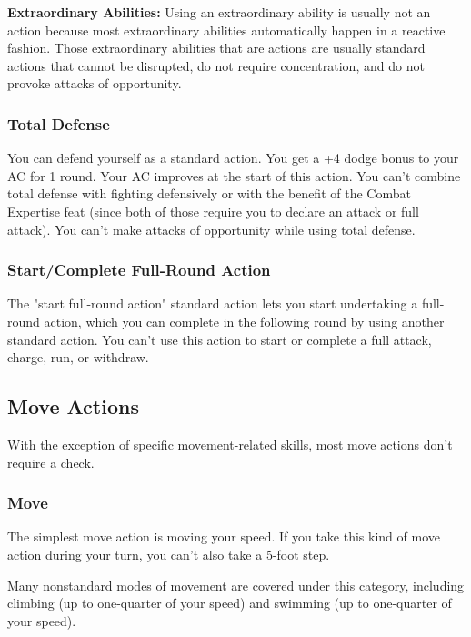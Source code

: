\textbf{Extraordinary Abilities:} Using an extraordinary ability is usually not 
an action because most extraordinary abilities automatically happen in a reactive 
fashion. Those extraordinary abilities that are actions are usually standard actions 
that cannot be disrupted, do not require concentration, and do not provoke attacks 
of opportunity.

\subsubsection{Total Defense}

You can defend yourself as a standard action. You get a +4 dodge bonus to your 
AC for 1 round. Your AC improves at the start of this action. You can't combine 
total defense with fighting defensively or with the benefit of the Combat Expertise 
feat (since both of those require you to declare an attack or full attack). You 
can't make attacks of opportunity while using total defense.

\subsubsection{Start/Complete Full-Round Action}

The "start full-round action" standard action lets you start undertaking a full-round 
action, which you can complete in the following round by using another standard 
action. You can't use this action to start or complete a full attack, charge, run, 
or withdraw.

\subsection{Move Actions}

With the exception of specific movement-related skills, most move actions don't 
require a check.

\subsubsection{Move}

The simplest move action is moving your speed. If you take this kind of move action 
during your turn, you can't also take a 5-foot step.

Many nonstandard modes of movement are covered under this category, including climbing 
(up to one-quarter of your speed) and swimming (up to one-quarter of your speed).


